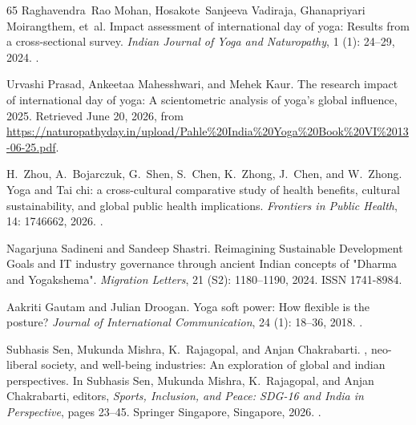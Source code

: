 \documentclass[11pt]{article}
\begin{document}
\begin{thebibliography}{65}
Raghavendra~Rao Mohan, Hosakote~Sanjeeva Vadiraja, Ghanapriyari Moirangthem,
  et~al.
\newblock Impact assessment of international day of yoga: Results from a
  cross-sectional survey.
\newblock \emph{Indian Journal of Yoga and Naturopathy}, 1
  (1): 24--29, 2024.
\newblock {}.

Urvashi Prasad, Ankeetaa Mahesshwari, and Mehek Kaur.
\newblock The research impact of international day of yoga: A scientometric
  analysis of yoga's global influence, 2025.
\newblock Retrieved June 20, 2026, from
  \url{https://naturopathyday.in/upload/Pahle%20India%20Yoga%20Book%20VI%2013-06-25.pdf}.

H.~Zhou, A.~Bojarczuk, G.~Shen, S.~Chen, K.~Zhong, J.~Chen, and W.~Zhong.
\newblock Yoga and {Tai} chi: a cross-cultural comparative study of health
  benefits, cultural sustainability, and global public health implications.
\newblock \emph{Frontiers in Public Health}, 14: 1746662, 2026.
\newblock {}.

Nagarjuna Sadineni and Sandeep Shastri.
\newblock Reimagining {Sustainable Development Goals} and {IT} industry
  governance through ancient {Indian} concepts of "{Dharma} and {Yogakshema}".
\newblock \emph{Migration Letters}, 21 (S2): 1180--1190,
  2024.
\newblock ISSN 1741-8984.

Aakriti Gautam and Julian Droogan.
\newblock Yoga soft power: How flexible is the posture?
\newblock \emph{Journal of International Communication}, 24
  (1): 18--36, 2018.
\newblock {}.

Subhasis Sen, Mukunda Mishra, K.~Rajagopal, and Anjan Chakrabarti.
, neo-liberal society, and well-being industries: An
  exploration of global and indian perspectives.
\newblock In Subhasis Sen, Mukunda Mishra, K.~Rajagopal, and Anjan Chakrabarti,
  editors, \emph{Sports, Inclusion, and Peace: SDG-16 and India in
  Perspective}, pages 23--45. Springer Singapore, Singapore, 2026.
\newblock {}.


\end{thebibliography}
\end{document}
